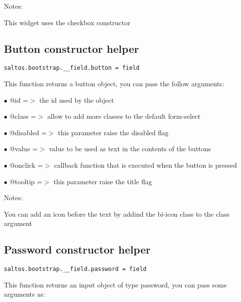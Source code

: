 \documentclass[a4paper]{book}
\begin{document}
Notes:

This widget uses the checkbox constructor

\hypertarget{toc451}{}
\subsection{Button constructor helper}

\begin{lstlisting}
saltos.bootstrap.__field.button = field
\end{lstlisting}

This function returns a button object, you can pass the follow arguments:

\begin{compactitem}
\item[\color{myblue}$\bullet$] @id       =$>$ the id used by the object
\item[\color{myblue}$\bullet$] @class    =$>$ allow to add more classes to the default form-select
\item[\color{myblue}$\bullet$] @disabled =$>$ this parameter raise the disabled flag
\item[\color{myblue}$\bullet$] @value    =$>$ value to be used as text in the contents of the buttons
\item[\color{myblue}$\bullet$] @onclick  =$>$ callback function that is executed when the button is pressed
\item[\color{myblue}$\bullet$] @tooltip  =$>$ this parameter raise the title flag
\end{compactitem}

Notes:

You can add an icon before the text by addind the bi-icon class to the class argument

\hypertarget{toc452}{}
\subsection{Password constructor helper}

\begin{lstlisting}
saltos.bootstrap.__field.password = field
\end{lstlisting}

This function returns an input object of type password, you can pass some arguments as:
\end{document}
